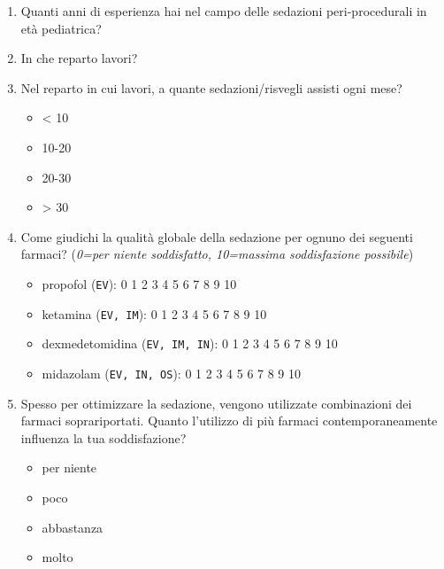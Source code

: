 \begin{enumerate}
           \item Quanti anni di esperienza hai nel campo delle sedazioni peri-procedurali in età pediatrica?
           
           \item In che reparto lavori?
           
           \item Nel reparto in cui lavori, a quante sedazioni/risvegli assisti ogni mese?
           \begin{itemize}
               \item < 10
               \item 10-20
               \item 20-30
               \item > 30
           \end{itemize}
           
           \item Come giudichi la qualità globale della sedazione per ognuno dei seguenti farmaci? (\emph{0=per niente soddisfatto, 10=massima soddisfazione possibile})
           \begin{itemize}
               \item propofol (\texttt{EV}): 0 1 2 3 4 5 6 7 8 9 10
               \item ketamina (\texttt{EV, IM}): 0 1 2 3 4 5 6 7 8 9 10
               \item dexmedetomidina (\texttt{EV, IM, IN}): 0 1 2 3 4 5 6 7 8 9 10
               \item midazolam (\texttt{EV, IN, OS}): 0 1 2 3 4 5 6 7 8 9 10
           \end{itemize}
           
           \item Spesso per ottimizzare la sedazione, vengono utilizzate combinazioni dei farmaci soprariportati. Quanto l'utilizzo di più farmaci contemporaneamente influenza la tua soddisfazione?
           \begin{itemize}
               \item per niente
               \item poco
               \item abbastanza
               \item molto
           \end{itemize}
           

\end{enumerate}
